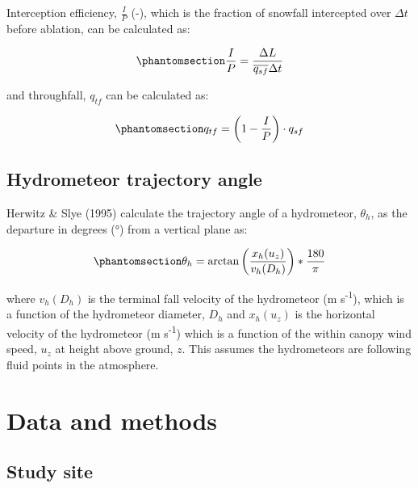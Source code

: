 \documentclass[
  letterpaper,
  DIV=11,
  numbers=noendperiod]{scrartcl}
\begin{document}
Interception efficiency, \(\frac{I}{P}\) (-), which is the fraction of
snowfall intercepted over \(\Delta t\) before ablation, can be
calculated as:

\begin{equation}\phantomsection\label{eq-ip}{
\frac{I}{P} = \frac{\Delta L}{\overline{q_{sf}} \Delta t}
}\end{equation}

and throughfall, \(q_{tf}\) can be calculated as:

\begin{equation}\phantomsection\label{eq-event-tf}{
q_{tf} = \left(1 - \frac{I}{P} \right) \cdot q_{sf}
}\end{equation}

\subsection{Hydrometeor trajectory
angle}\label{hydrometeor-trajectory-angle}

Herwitz \& Slye (1995) calculate the trajectory angle of a hydrometeor,
\(\theta_h\), as the departure in degrees (°) from a vertical plane as:

\begin{equation}\phantomsection\label{eq-ta}{
\theta_h = \arctan \left(\frac{x_h(u_z)}{v_h(D_h)}\right)*\frac{180}{\pi}
}\end{equation}

where \(v_h(D_h)\) is the terminal fall velocity of the hydrometeor (m
s\textsuperscript{-1}), which is a function of the hydrometeor diameter,
\(D_h\) and \(x_h(u_z)\) is the horizontal velocity of the hydrometeor
(m s\textsuperscript{-1}) which is a function of the within canopy wind
speed, \(u_z\) at height above ground, \(z\). This assumes the
hydrometeors are following fluid points in the atmosphere.

\section{Data and methods}\label{data-and-methods}

\subsection{Study site}\label{study-site}
\end{document}

